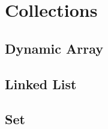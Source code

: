 \chapter{Collections}

\section{Dynamic Array}
\csharpsubsection{\csharp}

\section{Linked List}
\csharpsubsection{\csharp}

\section{Set}
\csharpsubsection{\csharp}

